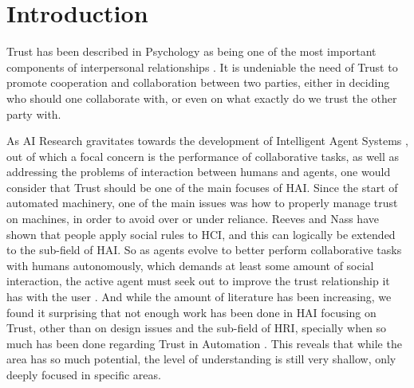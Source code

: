 \section{Introduction}
\label{sec:Introduction}

Trust has been described in Psychology as being one of the most important components of interpersonal relationships \cite{Simpson2007}. It is undeniable the need of Trust to promote cooperation and collaboration between two parties, either in deciding who should one collaborate with, or even on what exactly do we trust the other party with. 


As \ac{AI} Research gravitates towards the development of Intelligent Agent Systems \cite{Russell2009a}, out of which a focal concern is the performance of collaborative tasks\cite{Grosz1996, Allen2002, Allen2007}, as well as addressing the problems of interaction between humans and agents\cite{Bradshaw2011}, one would consider that Trust should be one of the main focuses of \ac{HAI}. Since the start of automated machinery, one of the main issues was how to properly manage trust on machines, in order to avoid over or under reliance\cite{Lee2004}. Reeves and Nass have shown that people apply social rules to \ac{HCI}, and this can logically be extended to the sub-field of \ac{HAI}\cite{Reeves1998a}. So as agents evolve to better perform collaborative tasks with humans autonomously, which demands at least some amount of social interaction, the active agent must seek out to improve the trust relationship it has with the user \cite{Lashkari1994}. And while the amount of literature has been increasing, we found it surprising that not enough work has been done in \ac{HAI} focusing on Trust, other than on design issues\cite{Bickmore2005} and the sub-field of \ac{HRI}\cite{Goodrich2007, VandenBrule2014}, specially when so much has been done regarding Trust in Automation \cite{Lee1992, Jones1997, Lee2004}. This reveals that while the area has so much potential, the level of understanding is still very shallow, only deeply focused in specific areas.

